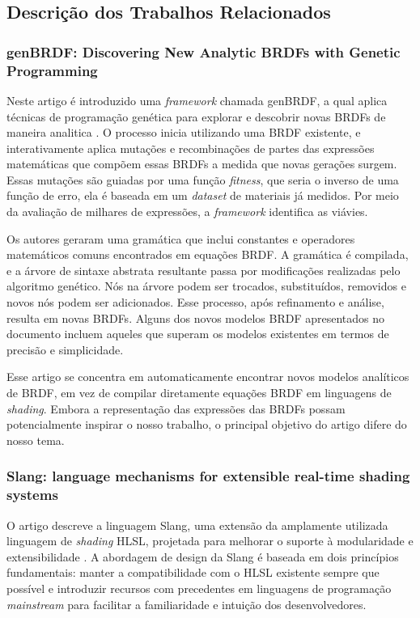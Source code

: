 \documentclass[english, 
               brazil, 
               bsc] %
               {dcomp-abntex2}
\begin{document}
\subsection{Descrição dos Trabalhos Relacionados}


\subsubsection{genBRDF: Discovering New Analytic BRDFs with Genetic Programming}


Neste artigo é introduzido uma  \textit{framework} chamada genBRDF, a qual aplica técnicas de programação genética para explorar e descobrir novas BRDFs de maneira analitica \cite{genbrdf}. O processo inicia utilizando uma BRDF existente, e interativamente aplica mutações e recombinações de partes das expressões matemáticas que compõem essas BRDFs a medida que novas gerações surgem. Essas mutações são guiadas por uma função \textit{fitness}, que seria o inverso de uma função de erro, ela é baseada em um \textit{dataset} de materiais já medidos. Por meio da avaliação de milhares de expressões, a  \textit{framework} identifica as viávies.


Os autores geraram uma gramática que inclui constantes e operadores matemáticos comuns encontrados em equações BRDF. A gramática é compilada, e a árvore de sintaxe abstrata resultante passa por modificações realizadas pelo algoritmo genético. Nós na árvore podem ser trocados, substituídos, removidos e novos nós podem ser adicionados. Esse processo, após refinamento e análise, resulta em novas BRDFs. Alguns dos novos modelos BRDF apresentados no documento incluem aqueles que superam os modelos existentes em termos de precisão e simplicidade.
 
Esse artigo se concentra em automaticamente encontrar novos modelos analíticos de BRDF, em vez de compilar diretamente equações BRDF em linguagens de \textit{shading}. Embora a representação das expressões das BRDFs possam potencialmente inspirar o nosso trabalho, o principal objetivo do artigo difere do nosso tema.


\subsubsection{Slang: language mechanisms for extensible real-time shading systems}


O artigo descreve a linguagem Slang, uma extensão da amplamente utilizada linguagem de \textit{shading} HLSL, projetada para melhorar o suporte à modularidade e extensibilidade \cite{slang}. A abordagem de design da Slang é baseada em dois princípios fundamentais: manter a compatibilidade com o HLSL existente sempre que possível e introduzir recursos com precedentes em linguagens de programação \textit{mainstream} para facilitar a familiaridade e intuição dos desenvolvedores.
\end{document}
